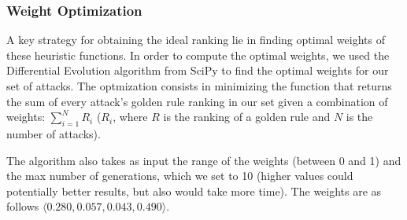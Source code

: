 \documentclass[conference]{IEEEtran}
\begin{document}
\subsubsection{Weight Optimization}
\label{sec:weight-optimization}
A key strategy for obtaining the ideal ranking lie in finding optimal weights
of these heuristic functions. 
%
In  order to compute the optimal weights, we used the Differential Evolution 
algorithm from SciPy to find the optimal weights for our set of attacks.
The optmization consists in minimizing the function that returns the sum of 
every attack's golden rule ranking in our set given a combination of weights: 
\indent
$\sum_{i=1}^{N}\mathit{R_i}$ ($\mathit{R_i}$, where $\mathit{R}$ is the 
ranking of a golden rule and $\mathit{N}$ is the number of attacks).

The algorithm also takes as input the range of the weights (between 0 and 1) 
and the max number of generations, which we set to 10 (higher values could 
potentially better results, but also would take more time). The weights are 
as follows $\langle{}0.280, 0.057, 0.043, 0.490\rangle$.
\end{document}
